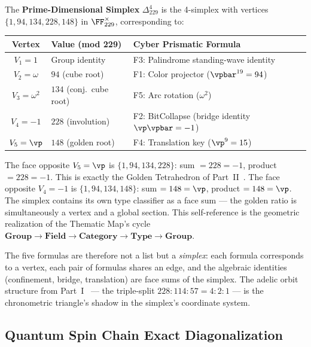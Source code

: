 \begin{definition}[Prime-Dimensional Simplex at $p = 229$]
The \textbf{Prime-Dimensional Simplex} $\Delta^4_{229}$ is the 4-simplex with vertices $\{1, 94, 134, 228, 148\}$ in $\FF_{229}^\times$, corresponding to:
\begin{center}
\begin{tabular}{@{}cll@{}}
\toprule
\textbf{Vertex} & \textbf{Value (mod 229)} & \textbf{Cyber Prismatic Formula} \\
\midrule
$V_1 = 1$ & Group identity & F3: Palindrome standing-wave identity \\
$V_2 = \omega$ & $94$ (cube root) & F1: Color projector ($\vpbar^{19} = 94$) \\
$V_3 = \omega^2$ & $134$ (conj.\ cube root) & F5: Arc rotation ($\omega^2$) \\
$V_4 = -1$ & $228$ (involution) & F2: BitCollapse (bridge identity $\vp\vpbar = -1$) \\
$V_5 = \vp$ & $148$ (golden root) & F4: Translation key ($\vp^9 = 15$) \\
\bottomrule
\end{tabular}
\end{center}
\end{definition}

The face opposite $V_5 = \vp$ is $\{1, 94, 134, 228\}$: sum $= 228 = -1$, product $= 228 = -1$. This is exactly the Golden Tetrahedron of Part~II~\cite{larue_chromatic}. The face opposite $V_4 = -1$ is $\{1, 94, 134, 148\}$: sum $= 148 = \vp$, product $= 148 = \vp$. The simplex contains its own type classifier as a face sum --- the golden ratio is simultaneously a vertex and a global section. This self-reference is the geometric realization of the Thematic Map's cycle $\textbf{Group} \to \textbf{Field} \to \textbf{Category} \to \textbf{Type} \to \textbf{Group}$.

The five formulas are therefore not a list but a \emph{simplex}: each formula corresponds to a vertex, each pair of formulas shares an edge, and the algebraic identities (confinement, bridge, translation) are face sums of the simplex. The adelic orbit structure from Part~I~\cite{dwm_fst} --- the triple-split $228:114:57 = 4:2:1$ --- is the chronometric triangle's shadow in the simplex's coordinate system.

\subsection{Quantum Spin Chain Exact Diagonalization}

